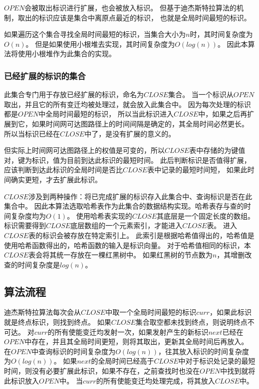 $OPEN$会被取出标识进行扩展，也会被放入标识。
但基于迪杰斯特拉算法的机制，取出的标识应该是集合中离原点最近的标识，
也就是全局时间最短的标识。

如果遍历这个集合寻找全局时间最短的标识，当集合大小为$n$时，其时间复杂度为$O(n)$。
但是如果使用小根堆去实现，其时间复杂度为$O(log(n))$。
因此本算法将使用小根堆作为此集合的实现。

\subsubsection{已经扩展的标识的集合}
此集合专门用于存放已经扩展的标识，命名为$CLOSE$集合。
当一个标识从$OPEN$取出，并且它的所有变迁均被处理过，就会放入此集合中。
因为每次处理的标识都是$OPEN$中全局时间最短的标识，
所以当此标识进入$CLOSE$中，如果之后再扩展到它，如果时间网可达图路径上的时间间隔是确定的，其全局时间必然更长。
所以当标识已经在$CLOSE$中了，是没有扩展的意义的。

但实际上时间网可达图路径上的权值是可变的，所以$CLOSE$表中存储的为键值对，键为标识，值为目前到达此标识的最短时间。
此后判断标识是否值得扩展，应该判断到达此标识的全局时间是否比$CLOSE$表中记录的最短时间短，
如果此时间确实更短，才去扩展此标识。

$CLOSE$涉及到两种操作：将已完成扩展的标识存入此集合中、查询标识是否在此集合中。
因此本算法选取哈希表作为此集合的数据结构实现。哈希表存与查的时间复杂度均为$O(1)$。
使用哈希表实现的$CLOSE$其底层是一个固定长度的数组。
标识需要得到$CLOSE$底层数组的一个元素索引，才能进入$CLOSE$表。
进入$CLOSE$表的标识会被存放在特定索引上。
此索引是根据哈希值得出的，哈希值是使用哈希函数得出的，哈希函数的输入是标识向量。
对于哈希值相同的标识，本$CLOSE$表会将其统一存放在一棵红黑树中。
如果红黑树的节点数为$n$，其增删改查的时间复杂度是$log(n)$。

\subsection{算法流程}
迪杰斯特拉算法每次会从$CLOSE$中取一个全局时间最短的标识$curr$，如果此标识就是终点标识，则找到终点。
如果$CLOSE$集合取空都未找到终点，则说明终点不可达。
对$curr$的所有使能变迁均发射一次，如果发射产生的新标识$next$已经在$OPEN$中存在，并且其全局时间更短，则将其取出，更新其全局时间后再放入。
在$OPEN$中查询标识的时间复杂度为$O(log(n))$，往其放入标识的时间复杂度为$O(log(n))$。
如果$next$的全局时间已经高于$CLOSE$中对于标识处记录的最短时间，则没有必要扩展此标识，如果不存在，之前查找时也没在$OPEN$中找到就将此标识放入$OPEN$中。
当$curr$的所有使能变迁均处理完成，将其放入$CLOSE$中。

